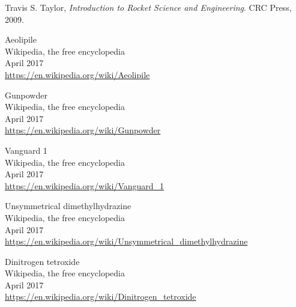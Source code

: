 \documentclass{article}
\begin{document}
\begin{thebibliography}{99}

	Travis S. Taylor,
	\emph{Introduction to Rocket Science and Engineering}.
	CRC Press,
	2009.
	
	Aeolipile\\
	Wikipedia, the free encyclopedia\\
	April 2017\\
	\url{https://en.wikipedia.org/wiki/Aeolipile}

	Gunpowder\\
	Wikipedia, the free encyclopedia\\
	April 2017\\
	\url{https://en.wikipedia.org/wiki/Gunpowder}
	
	Vanguard 1\\
	Wikipedia, the free encyclopedia\\
	April 2017\\
	\url{https://en.wikipedia.org/wiki/Vanguard_1}
	
	Unsymmetrical dimethylhydrazine\\
	Wikipedia, the free encyclopedia\\
	April 2017\\
	\url{https://en.wikipedia.org/wiki/Unsymmetrical_dimethylhydrazine}
	
	Dinitrogen tetroxide\\
	Wikipedia, the free encyclopedia\\
	April 2017\\
	\url{https://en.wikipedia.org/wiki/Dinitrogen_tetroxide}	

\end{thebibliography}
\end{document}

